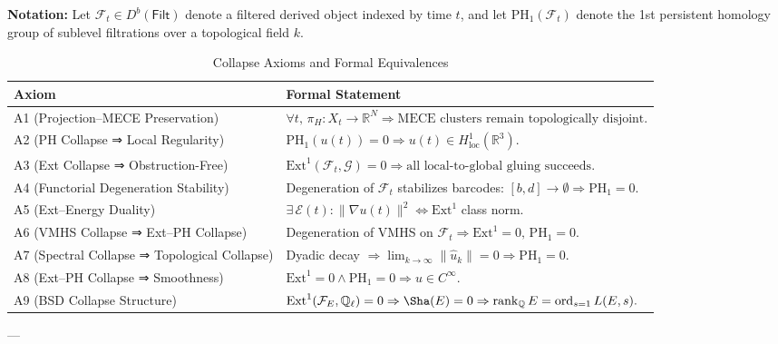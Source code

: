 \documentclass[11pt]{article}
\begin{document}
\begin{axiom}
\begin{axiom}
{{\textbf{Notation:} Let \( \mathcal{F}_t \in D^b(\mathsf{Filt}) \) denote a filtered derived object indexed by time \( t \),  
and let \( \mathrm{PH}_1(\mathcal{F}_t) \) denote the 1st persistent homology group of sublevel filtrations over a topological field \( k \).  

\usepackage{tabularx}
\usepackage{booktabs}

\begin{table}[H]
\centering
\renewcommand{\arraystretch}{1.4}
\begin{tabularx}{\textwidth}{lX}
\toprule
\textbf{Axiom} & \textbf{Formal Statement} \\
\midrule
A1 (Projection–MECE Preservation) & 
\( \forall t,\, \pi_H: X_t \to \mathbb{R}^N \Rightarrow \text{MECE clusters remain topologically disjoint}. \) \\
A2 (PH Collapse ⇒ Local Regularity) & 
\( \mathrm{PH}_1(u(t)) = 0 \Rightarrow u(t) \in H^1_{\text{loc}}(\mathbb{R}^3). \) \\
A3 (Ext Collapse ⇒ Obstruction-Free) & 
\( \mathrm{Ext}^1(\mathcal{F}_t, \mathcal{G}) = 0 \Rightarrow \text{all local-to-global gluing succeeds}. \) \\
A4 (Functorial Degeneration Stability) & 
Degeneration of \( \mathcal{F}_t \) stabilizes barcodes: \( [b,d] \to \emptyset \Rightarrow \mathrm{PH}_1 = 0. \) \\
A5 (Ext–Energy Duality) & 
\( \exists\, \mathcal{E}(t): \|\nabla u(t)\|^2 \Leftrightarrow \mathrm{Ext}^1 \) class norm. \\
A6 (VMHS Collapse ⇒ Ext–PH Collapse) & 
Degeneration of VMHS on \( \mathcal{F}_t \Rightarrow \mathrm{Ext}^1 = 0,\, \mathrm{PH}_1 = 0. \) \\
A7 (Spectral Collapse ⇒ Topological Collapse) & 
Dyadic decay \( \Rightarrow \lim_{k \to \infty} \|\hat{u}_k\| = 0 \Rightarrow \mathrm{PH}_1 = 0. \) \\
A8 (Ext–PH Collapse ⇒ Smoothness) & 
\( \mathrm{Ext}^1 = 0 \land \mathrm{PH}_1 = 0 \Rightarrow u \in C^\infty. \) \\
A9 (BSD Collapse Structure) & 
\( \mathrm{Ext}^1(\mathcal{F}_E, \mathbb{Q}_\ell) = 0 \Rightarrow \Sha(E) = 0 \Rightarrow 
\operatorname{rank}_{\mathbb{Q}} E = \operatorname{ord}_{s=1} L(E, s). \) \\
\bottomrule
\end{tabularx}
\caption{Collapse Axioms and Formal Equivalences}
\end{table}

---

}}
\end{axiom}
\end{axiom}
\end{document}
